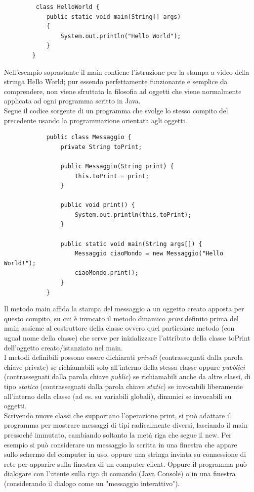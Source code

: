 \documentclass[a4paper,12 pt]{article}
\begin{document}
	\begin{lstlisting}
		 class HelloWorld {
			public static void main(String[] args)
			{
				System.out.println("Hello World");
			}
		}
	\end{lstlisting}

	\noindent Nell'esempio soprastante il main contiene l'istruzione per la stampa a video della stringa Hello World; pur essendo perfettamente funzionante e semplice da comprendere, non viene sfruttata la filosofia ad oggetti che viene normalmente applicata ad ogni programma scritto in Java.\\
	Segue il codice sorgente di un programma che svolge lo stesso compito del precedente usando la programmazione orientata agli oggetti.
		\begin{lstlisting}
			public class Messaggio {
				private String toPrint;
			
				public Messaggio(String print) {
					this.toPrint = print;
				}
			
				public void print() {
					System.out.println(this.toPrint);
				}
			
				public static void main(String args[]) {
					Messaggio ciaoMondo = new Messaggio("Hello World!");
					ciaoMondo.print();
				}
			}
	\end{lstlisting}
	
	\noindent Il metodo main affida la stampa del messaggio a un oggetto creato apposta per questo compito, su cui è invocato il metodo dinamico \textit{print} definito prima del main assieme al costruttore della classe ovvero quel particolare metodo (con ugual nome della classe) che serve per inizializzare l'attributo della classe toPrint dell'oggetto creato/istanziato nel main.\\ I metodi definibili possono essere dichiarati \textit{privati} (contrassegnati dalla parola chiave private) se richiamabili solo all'interno della stessa classe oppure\textit{ pubblici} (contrassegnati dalla parola chiave \textit{public}) se richiamabili anche da altre classi, di tipo \textit{statico} (contrassegnati dalla parola chiave \textit{static}) se invocabili liberamente all'interno della classe (ad es. su variabili globali), dinamici se invocabili su oggetti.\\
	
	\noindent Scrivendo nuove classi che supportano l'operazione print, si può adattare il programma per mostrare messaggi di tipi radicalmente diversi, lasciando il main pressoché immutato, cambiando soltanto la metà riga che segue il new. Per esempio si può considerare un messaggio la scritta in una finestra che appare sullo schermo del computer in uso, oppure una stringa inviata su connessione di rete per apparire sulla finestra di un computer client. Oppure il programma può dialogare con l'utente sulla riga di comando (Java Console) o in una finestra (considerando il dialogo come un "messaggio interattivo").	
	
\end{document}

